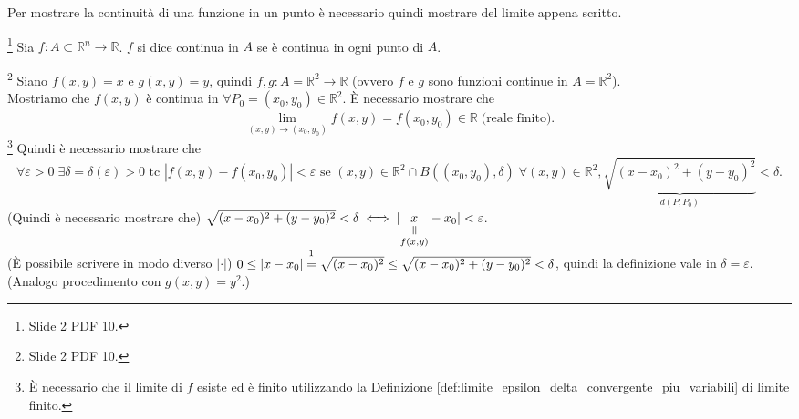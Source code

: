 Per mostrare la continuità di una funzione in un punto è necessario quindi mostrare del limite appena scritto.

\begin{definition}\footnote{Slide 2 PDF 10.}
    Sia $f\colon A\subset\mathbb R^n\rightarrow\mathbb R$. $f$ si dice continua in $A$ se è continua in ogni punto di $A$.
\end{definition}

\begin{example}\footnote{Slide 2 PDF 10.}
    Siano $f(x,y)=x$ e $g(x,y)=y$, quindi $f,g\colon A=\mathbb R^2\rightarrow\mathbb R$ (ovvero $f$ e $g$ sono funzioni continue in $A=\mathbb R^2$).\\
    Mostriamo che $f(x,y)$ è continua in $\forall P_0=(x_0,y_0)\in\mathbb R^2$. È necessario mostrare che
    \begin{equation*}
        \lim\limits_{(x,y)\rightarrow(x_0,y_0)}f(x,y)=f(x_0,y_0)\in\mathbb R\; \text{(reale finito)}.
    \end{equation*}
    \footnote{È necessario che il limite di $f$ esiste ed è finito utilizzando la Definizione \ref{def:limite_epsilon_delta_convergente_piu_variabili} di limite finito.} Quindi è necessario mostrare che
    \begin{equation*}
        \forall\varepsilon>0\;\exists\delta=\delta(\varepsilon)>0 \text{ tc } |f(x,y)-f(x_0,y_0)|<\varepsilon \text{ se } (x,y)\in\mathbb R^2\cap B((x_0,y_0),\delta)\; \forall (x,y)\in\mathbb R^2, \underbrace{\sqrt{(x-x_0)^2+(y-y_0)^2}}_{d(P,P_0)}<\delta.
    \end{equation*}
    (Quindi è necessario mostrare che) $\sqrt{(x-x_0)^2+(y-y_0)^2}<\delta\iff|\equalto{x}{f(x,y)}-x_0|<\varepsilon$.\\
    (È possibile scrivere in modo diverso $|\cdot|$)  $0\leq|x-x_0|\overset{\footnotemark}{=}\sqrt{(x-x_0)^2}\leq\sqrt{(x-x_0)^2+(y-y_0)^2}<\delta$, quindi la definizione vale in $\delta=\varepsilon$.\\
    (Analogo procedimento con $g(x,y)=y^2$.)
\end{example}

